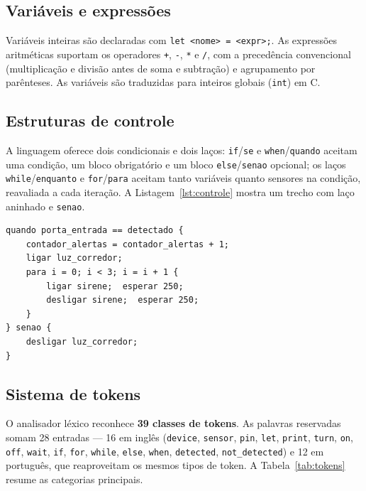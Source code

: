 \documentclass[conference]{IEEEtran}
\begin{document}
\subsection{Variáveis e expressões}

Variáveis inteiras são declaradas com \texttt{let <nome> = <expr>;}. As
expressões aritméticas suportam os operadores \texttt{+}, \texttt{-},
\texttt{*} e \texttt{/}, com a precedência convencional (multiplicação e
divisão antes de soma e subtração) e agrupamento por parênteses. As
variáveis são traduzidas para inteiros globais (\texttt{int}) em C.

\subsection{Estruturas de controle}
\label{subsec:controle}

A linguagem oferece dois condicionais e dois laços:
\texttt{if}/\texttt{se} e \texttt{when}/\texttt{quando} aceitam uma
condição, um bloco obrigatório e um bloco \texttt{else}/\texttt{senao}
opcional; os laços \texttt{while}/\texttt{enquanto} e
\texttt{for}/\texttt{para} aceitam tanto variáveis quanto sensores na
condição, reavaliada a cada iteração. A Listagem~\ref{lst:controle} mostra
um trecho com laço aninhado e \texttt{senao}.

\begin{lstlisting}[style=homescript,caption={Estruturas de controle e bilinguismo.},label={lst:controle}]
quando porta_entrada == detectado {
    contador_alertas = contador_alertas + 1;
    ligar luz_corredor;
    para i = 0; i < 3; i = i + 1 {
        ligar sirene;  esperar 250;
        desligar sirene;  esperar 250;
    }
} senao {
    desligar luz_corredor;
}
\end{lstlisting}

\subsection{Sistema de tokens}

O analisador léxico reconhece \textbf{39 classes de tokens}. As palavras
reservadas somam 28 entradas --- 16 em inglês (\texttt{device}, \texttt{sensor},
\texttt{pin}, \texttt{let}, \texttt{print}, \texttt{turn}, \texttt{on},
\texttt{off}, \texttt{wait}, \texttt{if}, \texttt{for}, \texttt{while},
\texttt{else}, \texttt{when}, \texttt{detected}, \texttt{not\_detected}) e
12 em português, que reaproveitam os mesmos tipos de token. A
Tabela~\ref{tab:tokens} resume as categorias principais.
\end{document}
